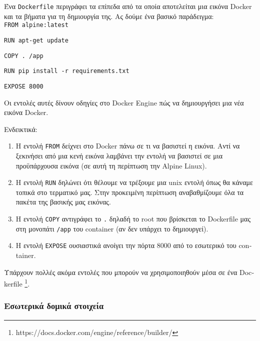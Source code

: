 Ένα \texttt{\textlatin{Dockerfile}} περιγράφει τα επίπεδα από τα οποία
αποτελείται μια εικόνα \textlatin{Docker} και τα βήματα για τη δημιουργία της.
Ας δούμε ένα βασικό παράδειγμα: \\

\texttt{\textlatin{FROM alpine:latest}}

\texttt{\textlatin{RUN apt-get update}}

\texttt{\textlatin{COPY . /app}}

\texttt{\textlatin{RUN pip install -r requirements.txt}}

\texttt{\textlatin{EXPOSE 8000}}

Οι εντολές αυτές δίνουν οδηγίες στο \textlatin{Docker Engine} πώς να
δημιουργήσει μια νέα εικόνα \textlatin{Docker}.

Ενδεικτικά:

\begin{enumerate}
 
   \item H εντολή \texttt{\textlatin{FROM}} δείχνει στο \textlatin{Docker} πάνω
    σε τι να βασιστεί η εικόνα. Αντί να ξεκινήσει από μια κενή εικόνα λαμβάνει
    την εντολή να βασιστεί σε μια προϋπάρχουσα εικόνα (σε αυτή τη περίπτωση
    την \textlatin{Alpine Linux}).

    \item H εντολή \texttt{\textlatin{RUN}} δηλώνει ότι θέλουμε να τρέξουμε μια
    \textlatin{unix} εντολή όπως θα κάναμε τοπικά στο τερματικό μας. Στην
    προκειμένη περίπτωση αναβαθμίζουμε όλα τα πακέτα της βασικής μας
    εικόνας.

    \item H εντολή \texttt{\textlatin{COPY}} αντιγράφει το \texttt{.} δηλαδή το
    \textlatin{root} που βρίσκεται το \textlatin{Dockerfile} μας στη μονοπάτι
    \texttt{\textlatin{/app}} του \textlatin{container} (αν δεν υπάρχει το
    δημιουργεί). 

    \item Η εντολή \texttt{\textlatin{EXPOSE}} ουσιαστικά ανοίγει την πόρτα
    8000 από το εσωτερικό του \textlatin{container}.

\end{enumerate}

Υπάρχουν πολλές ακόμα εντολές που μπορούν να χρησιμοποιηθούν μέσα σε ένα
\textlatin{Dockerfile} 
\footnote{\textlatin{https://docs.docker.com/engine/reference/builder/}}.


\subsubsection{Εσωτερικά δομικά στοιχεία}

